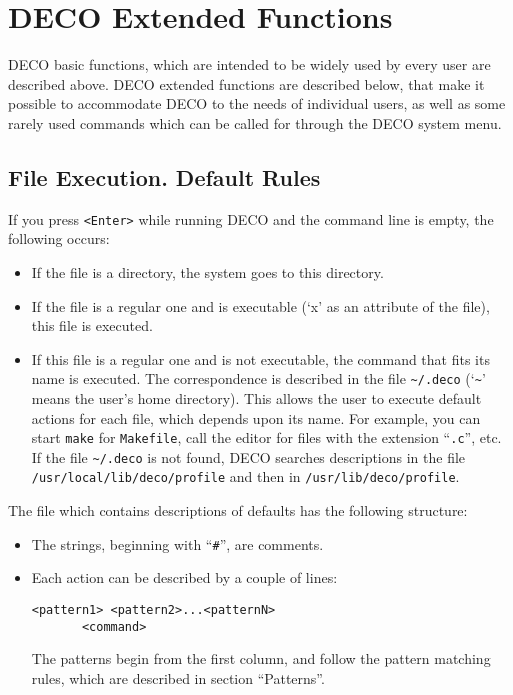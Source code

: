 \section{DECO Extended Functions}

DECO basic functions, which are intended to be widely used by every user
are described above. DECO extended functions are described below, that
make it possible to accommodate DECO to the needs of individual users,
as well as some rarely used commands which can be called for through the DECO
system menu.

\subsection{File Execution. Default Rules}

If you press {\tt <Enter>} while running DECO and the command line is empty,
the following occurs:
\begin{itemize}
\item
If the file is a directory, the system goes to this directory.
\item
If the file is a regular one and is executable (`x'
as an attribute of the file), this file is executed.
\item
If this file is a regular one and is not executable, the command that
fits its name is executed. The correspondence is described in
the file {\tt \~{}/.deco} (`{\tt \~{}}' means the user's home directory).
This allows the user to execute default actions for each file, which
depends upon its name. For example, you can start {\tt make} for
{\tt Makefile}, call the editor for files with the extension ``{\tt .c}'',
etc. If the file {\tt \~{}/.deco} is not found, DECO searches descriptions
in the file {\tt /usr/local/lib/deco/profile} and then in
{\tt /usr/lib/deco/profile}.
\end{itemize}

The file which contains descriptions of defaults has the following structure:
\begin{itemize}
\item
The strings, beginning with ``{\tt \#}'', are comments.
\item
Each action can be described by a couple of lines:
\begin{source}
\begin{verbatim}
<pattern1> <pattern2>...<patternN>
       <command>
\end{verbatim}
\end{source}
The patterns begin from the first column, and follow the pattern
matching rules, which are described in section ``Patterns''.
\end{itemize}

